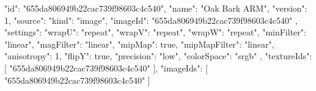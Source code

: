 {
  "id": "655da806949b22cac739f98603c4c540",
  "name": "Oak Bark ARM",
  "version": 1,
  "source": {
    "kind": "image",
    "imageId": "655da806949b22cac739f98603c4c540"
  },
  "settings": {
    "wrapU": "repeat",
    "wrapV": "repeat",
    "wrapW": "repeat",
    "minFilter": "linear",
    "magFilter": "linear",
    "mipMap": true,
    "mipMapFilter": "linear",
    "anisotropy": 1,
    "flipY": true,
    "precision": "low",
    "colorSpace": "srgb"
  },
  "textureIds": [
    "655da806949b22cac739f98603c4c540"
  ],
  "imageIds": [
    "655da806949b22cac739f98603c4c540"
  ]
}
